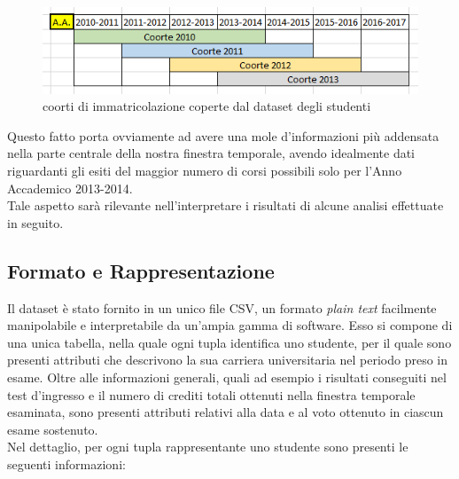 \begin{figure}
    \centering
    \caption{coorti di immatricolazione coperte dal dataset degli studenti}
    \label{1}
	\includegraphics[scale=0.7]{../raw/stud_comp.png}
\end{figure}

Questo fatto porta ovviamente ad avere una mole d'informazioni più addensata nella parte centrale della nostra finestra temporale, avendo idealmente dati riguardanti gli esiti del maggior numero di corsi possibili solo per l'Anno Accademico 2013-2014. \\

Tale aspetto sarà rilevante nell'interpretare i risultati di alcune analisi effettuate in seguito.

\subsection{Formato e Rappresentazione}

Il dataset è stato fornito in un unico file CSV, un formato \textit{plain text} facilmente manipolabile e interpretabile da un'ampia gamma di software. Esso si compone di una unica tabella, nella quale ogni tupla identifica uno studente, per il quale sono presenti attributi che descrivono la sua carriera universitaria nel periodo preso in esame. Oltre alle informazioni generali, quali ad esempio i risultati conseguiti nel test d'ingresso e il numero di crediti totali ottenuti nella finestra temporale esaminata, sono presenti attributi relativi alla data e al voto ottenuto in ciascun esame sostenuto. \\

Nel dettaglio, per ogni tupla rappresentante uno studente sono presenti le seguenti informazioni:

